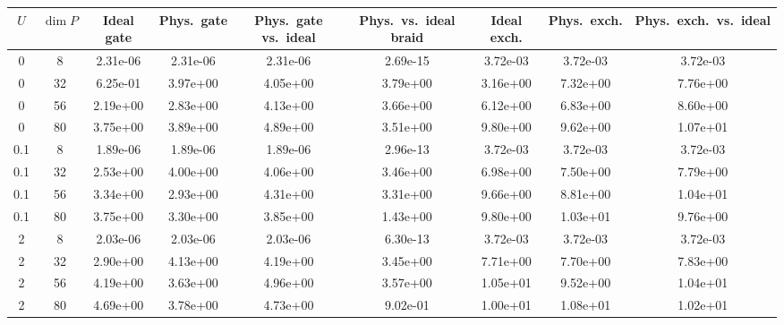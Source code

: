 \begin{tabular}{ccccccccc}
\hline
$U$ & $\dim P$ & Ideal gate & Phys.\ gate & Phys.\ gate vs.\ ideal & Phys.\ vs.\ ideal braid & Ideal exch. & Phys.\ exch. & Phys.\ exch.\ vs.\ ideal \\
\hline
0 & 8 & 2.31e-06 & 2.31e-06 & 2.31e-06 & 2.69e-15 & 3.72e-03 & 3.72e-03 & 3.72e-03 \\
0 & 32 & 6.25e-01 & 3.97e+00 & 4.05e+00 & 3.79e+00 & 3.16e+00 & 7.32e+00 & 7.76e+00 \\
0 & 56 & 2.19e+00 & 2.83e+00 & 4.13e+00 & 3.66e+00 & 6.12e+00 & 6.83e+00 & 8.60e+00 \\
0 & 80 & 3.75e+00 & 3.89e+00 & 4.89e+00 & 3.51e+00 & 9.80e+00 & 9.62e+00 & 1.07e+01 \\
\hline
0.1 & 8 & 1.89e-06 & 1.89e-06 & 1.89e-06 & 2.96e-13 & 3.72e-03 & 3.72e-03 & 3.72e-03 \\
0.1 & 32 & 2.53e+00 & 4.00e+00 & 4.06e+00 & 3.46e+00 & 6.98e+00 & 7.50e+00 & 7.79e+00 \\
0.1 & 56 & 3.34e+00 & 2.93e+00 & 4.31e+00 & 3.31e+00 & 9.66e+00 & 8.81e+00 & 1.04e+01 \\
0.1 & 80 & 3.75e+00 & 3.30e+00 & 3.85e+00 & 1.43e+00 & 9.80e+00 & 1.03e+01 & 9.76e+00 \\
\hline
2 & 8 & 2.03e-06 & 2.03e-06 & 2.03e-06 & 6.30e-13 & 3.72e-03 & 3.72e-03 & 3.72e-03 \\
2 & 32 & 2.90e+00 & 4.13e+00 & 4.19e+00 & 3.45e+00 & 7.71e+00 & 7.70e+00 & 7.83e+00 \\
2 & 56 & 4.19e+00 & 3.63e+00 & 4.96e+00 & 3.57e+00 & 1.05e+01 & 9.52e+00 & 1.04e+01 \\
2 & 80 & 4.69e+00 & 3.78e+00 & 4.73e+00 & 9.02e-01 & 1.00e+01 & 1.08e+01 & 1.02e+01 \\
\hline
\end{tabular}
